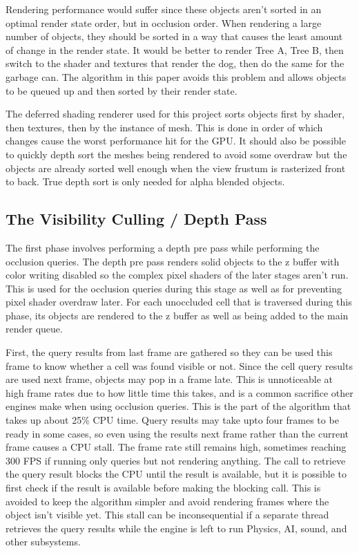 \documentclass[12pt]{ucthesis}
\begin{document}
Rendering performance would suffer since these objects aren't sorted in an optimal render state order, but in occlusion order.
When rendering a large number of objects, they should be sorted in a way that causes the least amount of change in the render state.
It would be better to render Tree A, Tree B, then switch to the shader and textures that render the dog, then do the same for the garbage can.
The algorithm in this paper avoids this problem and allows objects to be queued up and then sorted by their render state.

The deferred shading renderer used for this project sorts objects first by shader, then textures, then by the instance of mesh.
This is done in order of which changes cause the worst performance hit for the GPU.\cite{d3d10-sys}
It should also be possible to quickly depth sort the meshes being rendered to avoid some overdraw but the objects are already sorted well enough when the view frustum is rasterized front to back.
True depth sort is only needed for alpha blended objects.

\subsection {The Visibility Culling / Depth Pass}
\label{the-visibility-culling-depth-pass}

The first phase involves performing a depth pre pass while performing the occlusion queries.
The depth pre pass renders solid objects to the z buffer with color writing disabled so the complex pixel shaders of the later stages aren't run.
This is used for the occlusion queries during this stage as well as for preventing pixel shader overdraw later.
For each unoccluded cell that is traversed during this phase, its objects are rendered to the z buffer as well as being added to the main render queue.

First, the query results from last frame are gathered so they can be used this frame to know whether a cell was found visible or not.
Since the cell query results are used next frame, objects may pop in a frame late.
This is unnoticeable at high frame rates due to how little time this takes, and is a common sacrifice other engines make when using occlusion queries.
This is the part of the algorithm that takes up about 25\% CPU time.
Query results may take upto four frames to be ready in some cases, so even using the results next frame rather than the current frame causes a CPU stall.
The frame rate still remains high, sometimes reaching 300 FPS if running only queries but not rendering anything.
The call to retrieve the query result blocks the CPU until the result is available, but it is possible to first check if the result is available before making the blocking call.
This is avoided to keep the algorithm simpler and avoid rendering frames where the object isn't visible yet.
This stall can be inconsequential if a separate thread retrieves the query results while the engine is left to run Physics, AI, sound, and other subsystems.
\end{document}
